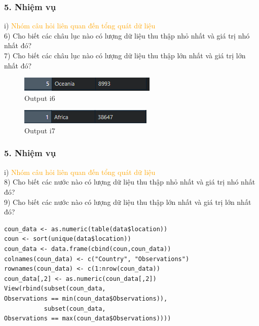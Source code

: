 \documentclass[english,10pt,table]{beamer}
\begin{document}
\begin{frame}[fragile]
\frametitle{5.  Nhiệm vụ}
	i) \textcolor{orange}{Nhóm câu hỏi liên quan đến tổng quát dữ liệu}\\
	6) Cho biết các châu lục nào có lượng dữ liệu thu thập nhỏ nhất và giá trị nhó nhất đó?\\
	7) Cho biết các châu lục nào có lượng dữ liệu thu thập lớn nhất và giá trị lớn nhất đó?
\begin{figure}[h!]
	\begin{center}
		    \includegraphics[scale = 1]{Images/I/I6.png}
		            \caption{Output i6}
		\end{center}
		\end{figure}
		\begin{figure}[h!]
	\begin{center}
		    \includegraphics[scale = 1]{Images/I/I7.png}
		            \caption{Output i7}
		\end{center}
		\end{figure}
\end{frame}


\begin{frame}[fragile]
\frametitle{5.  Nhiệm vụ}
	i) \textcolor{orange}{Nhóm câu hỏi liên quan đến tổng quát dữ liệu}\\
	8) Cho biết các nước nào có lượng dữ liệu thu thập nhỏ nhất và giá trị nhó nhất đó?\\
	9) Cho biết các nước nào có lượng dữ liệu thu thập lớn nhất và giá trị lớn nhất đó?
		\begin{lstlisting}[frame=single]  
coun_data <- as.numeric(table(data$location))
coun <- sort(unique(data$location))
coun_data <- data.frame(cbind(coun,coun_data))
colnames(coun_data) <- c("Country", "Observations")
rownames(coun_data) <- c(1:nrow(coun_data))
coun_data[,2] <- as.numeric(coun_data[,2])
View(rbind(subset(coun_data, 
Observations == min(coun_data$Observations)),
           subset(coun_data, 
Observations == max(coun_data$Observations))))
	\end{lstlisting}
\end{frame}
\end{document}
